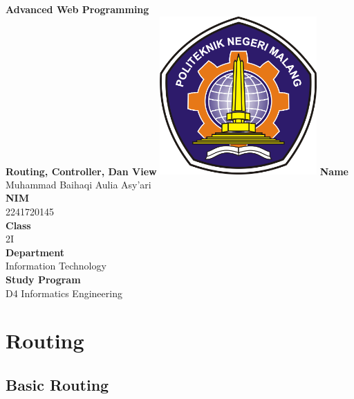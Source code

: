 \documentclass[12pt,titlepage]{article}
\newcommand{\vSubject}{Advanced Web Programming}
\newcommand{\vSubtitle}{Routing, Controller, Dan View}
\newcommand{\vName}{Muhammad Baihaqi Aulia Asy'ari}
\newcommand{\vNIM}{2241720145}
\newcommand{\vClass}{2I}
\newcommand{\vDepartment}{Information Technology}
\newcommand{\vStudyProgram}{D4 Informatics Engineering}
\begin{document}
\begin{titlepage}
    \centering
    \vfill
    {\bfseries\LARGE
        \vSubject\\
        \vskip0.25cm
        \vSubtitle
    }
    \vfill
    \includegraphics[width=6cm]{images/polinema-logo.png}
    \vfill
    {
        \textbf{Name}\\
        \vName\\
        \vskip0.5cm
        \textbf{NIM}\\
        \vNIM\\
        \vskip0.5cm
        \textbf{Class}\\
        \vClass\\
        \vskip0.5cm
        \textbf{Department}\\
        \vDepartment\\
        \vskip0.5cm
        \textbf{Study Program}\\
        \vStudyProgram
    }
\end{titlepage}

\newpage

\section{Routing}
\subsection{Basic Routing}
\end{document}
